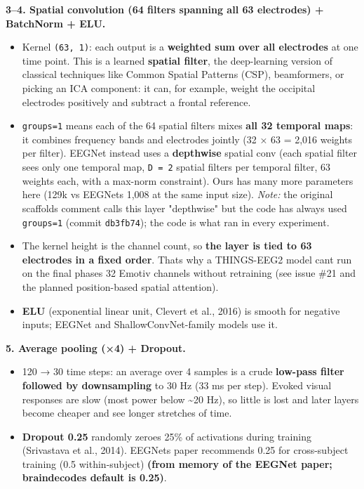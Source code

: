 \documentclass[
  11pt,
]{article}
\providecommand{\tightlist}{%
  \setlength{\itemsep}{0pt}\setlength{\parskip}{0pt}}
\renewcommand{\_}{\oldunderscore\allowbreak}
\begin{document}
\textbf{3--4. Spatial convolution (64
filters spanning all 63 electrodes) +
BatchNorm + ELU.}

\begin{itemize}
\tightlist
\item
  Kernel \texttt{(63,\ 1)}: each output
  is a \textbf{weighted sum over all
  electrodes} at one time point. This is
  a learned \textbf{spatial filter}, the
  deep-learning version of classical
  techniques like Common Spatial
  Patterns (CSP), beamformers, or
  picking an ICA component: it can, for
  example, weight the occipital
  electrodes positively and subtract a
  frontal reference.
\item
  \texttt{groups=1} means each of the 64
  spatial filters mixes \textbf{all 32
  temporal maps}: it combines frequency
  bands and electrodes jointly (32 × 63
  = 2,016 weights per filter). EEGNet
  instead uses a \textbf{depthwise}
  spatial conv (each spatial filter sees
  only one temporal map,
  \texttt{D\ =\ 2} spatial filters per
  temporal filter, 63 weights each, with
  a max-norm constraint). Ours has many
  more parameters here (129k vs
  EEGNet\textquotesingle s 1,008 at the
  same input size). \emph{Note:} the
  original scaffold\textquotesingle s
  comment calls this layer "depthwise"
  but the code has always used
  \texttt{groups=1} (commit
  \texttt{db3fb74}); the code is what
  ran in every experiment.
\item
  The kernel height is the channel
  count, so \textbf{the layer is tied to
  63 electrodes in a fixed order}.
  That\textquotesingle s why a
  THINGS-EEG2 model
  can\textquotesingle t run on the final
  phase\textquotesingle s 32 Emotiv
  channels without retraining (see issue
  \#21 and the planned position-based
  spatial attention).
\item
  \textbf{ELU} (exponential linear unit,
  Clevert et al., 2016) is smooth for
  negative inputs; EEGNet and
  ShallowConvNet-family models use it.
\end{itemize}

\textbf{5. Average pooling (×4) +
Dropout.}

\begin{itemize}
\tightlist
\item
  120 → 30 time steps: an average over 4
  samples is a crude \textbf{low-pass
  filter followed by downsampling} to 30
  Hz (33 ms per step). Evoked visual
  responses are slow (most power below
  \textasciitilde20 Hz), so little is
  lost and later layers become cheaper
  and see longer stretches of time.
\item
  \textbf{Dropout 0.25} randomly zeroes
  25\% of activations during training
  (Srivastava et al., 2014).
  EEGNet\textquotesingle s paper
  recommends 0.25 for cross-subject
  training (0.5 within-subject)
  \textbf{(from memory of the EEGNet
  paper; braindecode\textquotesingle s
  default is 0.25)}.
\end{itemize}
\end{document}
